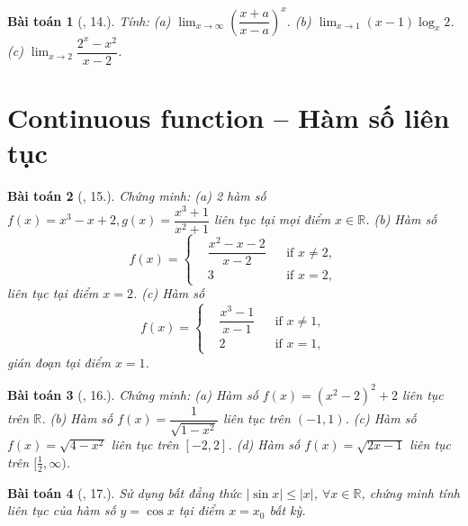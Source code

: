 \documentclass[oneside]{book}
\newtheorem{baitoan}{Bài toán}
\begin{document}
\begin{baitoan}[\cite{TLCT_dai_so_giai_tich_11}, 14.]
	Tính: (a) $\lim_{x\to\infty} \left(\dfrac{x + a}{x - a}\right)^x$. (b) $\lim_{x\to1} (x - 1)\log_x2$. (c) $\lim_{x\to2} \dfrac{2^x - x^2}{x - 2}$.
\end{baitoan}


\section{Continuous function -- Hàm số liên tục}

\begin{baitoan}[\cite{TLCT_dai_so_giai_tich_11}, 15.]
	Chứng minh: (a) 2 hàm số $f(x) = x^3 - x + 2,g(x) = \dfrac{x^3 + 1}{x^2 + 1}$ liên tục tại mọi điểm $x\in\mathbb{R}$. (b) Hàm số
	\begin{equation*}
		f(x) = \left\{\begin{split}
			&\dfrac{x^2 - x - 2}{x - 2}&&\mbox{if } x\ne2,\\
			&3&&\mbox{if } x = 2,
		\end{split}\right.
	\end{equation*}
	liên tục tại điểm $x = 2$. (c) Hàm số
	\begin{equation*}
		f(x) = \left\{\begin{split}
			&\dfrac{x^3 - 1}{x - 1}&&\mbox{if } x\ne1,\\
			&2&&\mbox{if } x = 1,
		\end{split}\right.
	\end{equation*}
	gián đoạn tại điểm $x = 1$.
\end{baitoan}

\begin{baitoan}[\cite{TLCT_dai_so_giai_tich_11}, 16.]
	Chứng minh: (a) Hàm số $f(x) = (x^2 - 2)^2 + 2$ liên tục trên $\mathbb{R}$. (b) Hàm số $f(x) = \dfrac{1}{\sqrt{1 - x^2}}$ liên tục trên $(-1,1)$. (c) Hàm số $f(x) = \sqrt{4 - x^2}$ liên tục trên $[-2,2]$. (d) Hàm số $f(x) = \sqrt{2x - 1}$ liên tục trên $[\frac{1}{2},\infty)$.
\end{baitoan}

\begin{baitoan}[\cite{TLCT_dai_so_giai_tich_11}, 17.]
	Sử dụng bất đẳng thức $|\sin x|\le|x|$, $\forall x\in\mathbb{R}$, chứng minh tính liên tục của hàm số $y = \cos x$ tại điểm $x = x_0$ bất kỳ.
\end{baitoan}
\end{document}
